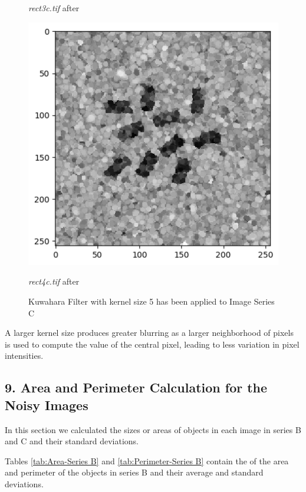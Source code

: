 \documentclass[runningheads]{llncs}
\begin{document}
\begin{figure}[h!]
\begin{minipage}[h]{0.47\linewidth}
\begin{center}
\caption{\emph{rect3c.tif} after}
\label{kc7-Kuwahara and Kernel 5}
\end{center}
\end{minipage}
\hfill
\begin{minipage}[h]{0.47\linewidth}
\begin{center}
\includegraphics[width=1\linewidth]{Report/Result_Images/image_kc8.png} 
\caption{\emph{rect4c.tif} after}
\label{kc8-Kuwahara and Kernel 5}
\end{center}
\end{minipage}
\caption*{Kuwahara Filter with kernel size 5 has been applied to Image Series C}
\label{kc5-8 Kuwahara5}
\end{figure}

A larger kernel size produces greater blurring as a larger neighborhood of pixels is used to compute the value of the central pixel, leading to less variation in pixel intensities. 
\newpage

\subsection*{9. Area and Perimeter Calculation for the Noisy Images}
\par In this section we calculated the sizes or areas of objects in each image in series B and C and their standard deviations. 
\par Tables \ref{tab:Area-Series B} and \ref{tab:Perimeter-Series B} contain the of the area and perimeter of the objects in series B and their average and standard deviations. 
\end{document}
